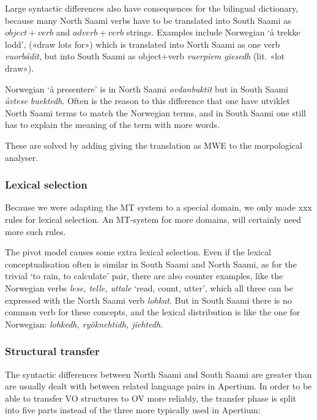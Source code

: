 \documentclass[a4paper,11pt,twocolumn]{article}
\begin{document}
Large syntactic differences also have consequences for the bilingual dictionary, because many North Saami verbs have to be translated into South Saami as $object+verb$ and $adverb+verb$ strings. Examples include Norwegian `å trekke lodd', («draw lots for») which is translated into North Saami as one verb \textit{vuorbádit}, but into South Saami as object+verb \textit{vuerpiem giesedh} (lit. «lot draw»).
  
Norwegian `å presentere' is in North Saami \textit{ovdanbuktit} but in South Saami \textit{åvtese buektedh}. Often is the reason to this difference that one have utviklet North Saami terms to match the Norwegian terms, and in South Saami one still has to explain the meaning of the term with more words.

These are solved by adding giving the translation as MWE to the morpological analyser.



\subsubsection{Lexical selection}
Because we were adapting the MT system to a special domain, we only made xxx rules for lexical selection. An MT-system for more domains, will certainly need more such rules. 

The pivot model causes some extra lexical selection. Even if the lexical conceptualisation often is similar in South Saami and North Saami, as for the trivial ‘to rain, to calculate’ pair, there are also counter examples, like the Norwegian verbs \textit{lese, telle, uttale} ‘read, count, utter’, which all three can be expressed with the North Saami verb \textit{lohkat}. But in South Saami there is no common verb for these concepts, and the lexical distribution is like the one for Norwegian: \textit{lohkedh, ryöknehtidh, jiehtedh}. 


\subsubsection{Structural transfer}

The syntactic differences between North Saami and South Saami are
greater than are usually dealt with between related language pairs
in Apertium. 
In order to be able to transfer VO structures to OV more reliably,
the transfer phase is split into five parts instead of the three
more typically used in Apertium:

\end{document}
